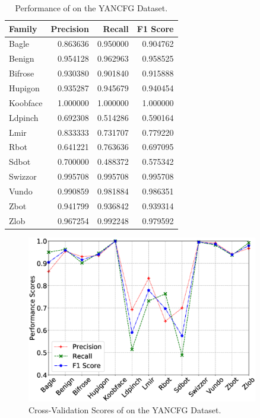 \begin{table}
    \caption{Performance of \sysname on the YANCFG Dataset.}
    \begin{center}
        \begin{tabular}{l|rrr}
            \hline
            Family &  Precision &    Recall &  F1 Score \\
            \hline
            \hline
            Bagle &   0.863636 &  0.950000 &  0.904762 \\
            Benign &   0.954128 &  0.962963 &  0.958525 \\
            Bifrose &   0.930380 &  0.901840 &  0.915888 \\
            Hupigon &   0.935287 &  0.945679 &  0.940454 \\
            Koobface &   1.000000 &  1.000000 &  1.000000 \\
            Ldpinch &   0.692308 &  0.514286 &  0.590164 \\
            Lmir &   0.833333 &  0.731707 &  0.779220 \\
            Rbot &   0.641221 &  0.763636 &  0.697095 \\
            Sdbot &   0.700000 &  0.488372 &  0.575342 \\
            Swizzor &   0.995708 &  0.995708 &  0.995708 \\
            Vundo &   0.990859 &  0.981884 &  0.986351 \\
            Zbot &   0.941799 &  0.936842 &  0.939314 \\
            Zlob &   0.967254 &  0.992248 &  0.979592 \\
            \hline
        \end{tabular}
    \end{center}
    \label{MG:Tab:YANCFGScores}
\end{table}

\begin{figure}
    \centerline{\includegraphics[width=0.90\textwidth]{Magic/figures/YanAcfgScores.eps}}
    \caption{Cross-Validation Scores of \sysname on the YANCFG Dataset.}
    \label{MG:Fig:YANCFGScores}
\end{figure}

